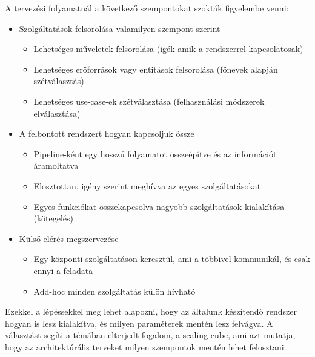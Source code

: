 \documentclass[11pt,magyar,a4paper,twoside,]{report}
\providecommand{\tightlist}{%
  \setlength{\itemsep}{0pt}\setlength{\parskip}{0pt}}
\begin{document}
A tervezési folyamatnál a következő szempontokat szokták figyelembe
venni:

\begin{itemize}
\tightlist
\item
  Szolgáltatások felsorolása valamilyen szempont szerint

  \begin{itemize}
  \tightlist
  \item
    Lehetséges műveletek felsorolása (igék amik a rendszerrel
    kapcsolatosak)
  \item
    Lehetséges erőforrások vagy entitások felsorolása (főnevek alapján
    szétválasztás)
  \item
    Lehetséges use-case-ek szétválasztása (felhasználási módszerek
    elválasztása)
  \end{itemize}
\item
  A felbontott rendszert hogyan kapcsoljuk össze

  \begin{itemize}
  \tightlist
  \item
    Pipeline-ként egy hosszú folyamatot összeépítve és az információt
    áramoltatva
  \item
    Elosztottan, igény szerint meghívva az egyes szolgáltatásokat
  \item
    Egyes funkciókat összekapcsolva nagyobb szolgáltatások kialakítása
    (kötegelés)
  \end{itemize}
\item
  Külső elérés megszervezése

  \begin{itemize}
  \tightlist
  \item
    Egy központi szolgáltatáson keresztül, ami a többivel kommunikál, és
    csak ennyi a feladata
  \item
    Add-hoc minden szolgáltatás külön hívható
  \end{itemize}
\end{itemize}

Ezekkel a lépéssekkel meg lehet alapozni, hogy az általunk készítendő
rendszer hogyan is lesz kialakítva, és milyen paraméterek mentén lesz
felvágva. A választást segíti a témában elterjedt fogalom, a scaling
cube\citep{scale-cube}, ami azt mutatja, hogy az architektúrális
terveket milyen szempontok mentén lehet felosztani.
\end{document}
